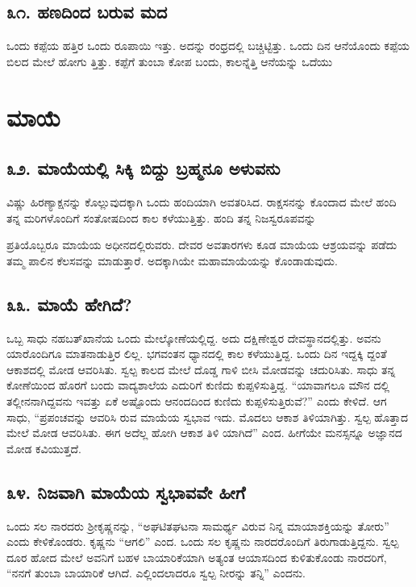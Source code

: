 \section{\num{೩೧. } ಹಣದಿಂದ ಬರುವ ಮದ}

ಒಂದು ಕಪ್ಪೆಯ ಹತ್ತಿರ ಒಂದು ರೂಪಾಯಿ ಇತ್ತು. ಅದನ್ನು ರಂಧ್ರದಲ್ಲಿ ಬಚ್ಚಿಟ್ಟಿತ್ತು. ಒಂದು ದಿನ ಆನೆಯೊಂದು ಕಪ್ಪೆಯ ಬಿಲದ ಮೇಲೆ ಹೋಗು ತ್ತಿತ್ತು. ಕಪ್ಪೆಗೆ ತುಂಬಾ ಕೋಪ ಬಂದು, ಕಾಲನ್ನೆತ್ತಿ ಆನೆಯನ್ನು ಒದೆಯು



\chapter{ಮಾಯೆ}

\section{\num{೩೨. } ಮಾಯೆಯಲ್ಲಿ ಸಿಕ್ಕಿ ಬಿದ್ದು ಬ್ರಹ್ಮನೂ ಅಳುವನು}

ವಿಷ್ಣು ಹಿರಣ್ಯಾಕ್ಷನನ್ನು ಕೊಲ್ಲುವುದಕ್ಕಾಗಿ ಒಂದು ಹಂದಿಯಾಗಿ ಅವತರಿಸಿದ. ರಾಕ್ಷಸನನ್ನು ಕೊಂದಾದ ಮೇಲೆ ಹಂದಿ ತನ್ನ ಮರಿಗಳೊಂದಿಗೆ ಸಂತೋಷದಿಂದ ಕಾಲ ಕಳೆಯುತ್ತಿತ್ತು. ಹಂದಿ ತನ್ನ ನಿಜಸ್ವರೂಪವನ್ನು

ಪ್ರತಿಯೊಬ್ಬರೂ ಮಾಯೆಯ ಅಧೀನದಲ್ಲಿರುವರು. ದೇವರ ಅವತಾರಗಳು ಕೂಡ ಮಾಯೆಯ ಆಶ್ರಯವನ್ನು ಪಡೆದು ತಮ್ಮ ಪಾಲಿನ ಕೆಲಸವನ್ನು ಮಾಡುತ್ತಾರೆ. ಅದಕ್ಕಾಗಿಯೇ ಮಹಾಮಾಯೆಯನ್ನು ಕೊಂಡಾಡುವುದು.


\section{\num{೩೩. } ಮಾಯೆ ಹೇಗಿದೆ?}

ಒಬ್ಬ ಸಾಧು ನಹಬತ್​ಖಾನೆಯ ಒಂದು ಮೇಲ್ಕೋಣೆಯಲ್ಲಿದ್ದ. ಅದು ದಕ್ಷಿಣೇಶ್ವರ ದೇವಸ್ಥಾನದಲ್ಲಿತ್ತು. ಅವನು ಯಾರೊಂದಿಗೂ ಮಾತನಾಡುತ್ತಿರ ಲಿಲ್ಲ. ಭಗವಂತನ ಧ್ಯಾನದಲ್ಲಿ ಕಾಲ ಕಳೆಯುತ್ತಿದ್ದ. ಒಂದು ದಿನ ಇದ್ದಕ್ಕಿ ದ್ದಂತೆ ಆಕಾಶದಲ್ಲಿ ಮೋಡ ಆವರಿಸಿತು. ಸ್ವಲ್ಪ ಕಾಲದ ಮೇಲೆ ದೊಡ್ಡ ಗಾಳಿ ಬೀಸಿ ಮೋಡವನ್ನು ಚದುರಿಸಿತು. ಸಾಧು ತನ್ನ ಕೋಣೆಯಿಂದ ಹೊರಗೆ ಬಂದು ವಾದ್ಯಶಾಲೆಯ ಎದುರಿಗೆ ಕುಣಿದು ಕುಪ್ಪಳಿಸುತ್ತಿದ್ದ. “ಯಾವಾಗಲೂ ಮೌನ ದಲ್ಲಿ ತಲ್ಲೀನನಾಗಿದ್ದವನು ಇವತ್ತು ಏಕೆ ಅಷ್ಟೊಂದು ಆನಂದದಿಂದ ಕುಣಿದು ಕುಪ್ಪಳಿಸುತ್ತಿರುವೆ?” ಎಂದು ಕೇಳಿದೆ. ಆಗ ಸಾಧು, “ಪ್ರಪಂಚವನ್ನು ಆವರಿಸಿ ರುವ ಮಾಯೆಯ ಸ್ವಭಾವ ಇದು. ಮೊದಲು ಆಕಾಶ ತಿಳಿಯಾಗಿತ್ತು. ಸ್ವಲ್ಪ ಹೊತ್ತಾದ ಮೇಲೆ ಮೋಡ ಆವರಿಸಿತು. ಈಗ ಅದೆಲ್ಲ ಹೋಗಿ ಆಕಾಶ ತಿಳಿ ಯಾಗಿದೆ” ಎಂದ. ಹೀಗೆಯೇ ಮನಸ್ಸನ್ನೂ ಅಜ್ಞಾನದ ಮೋಡ ಕವಿಯುತ್ತದೆ.


\section{\num{೩೪. } ನಿಜವಾಗಿ ಮಾಯೆಯ ಸ್ವಭಾವವೇ ಹೀಗೆ}

ಒಂದು ಸಲ ನಾರದರು ಶ್ರೀಕೃಷ್ಣನನ್ನು, “ಅಘಟಿತಘಟನಾ ಸಾಮರ್ಥ್ಯ ವಿರುವ ನಿನ್ನ ಮಾಯಾಶಕ್ತಿಯನ್ನು ತೋರು” ಎಂದು ಕೇಳಿಕೊಂಡರು. ಕೃಷ್ಣನು “ಆಗಲಿ” ಎಂದ. ಒಂದು ಸಲ ಕೃಷ್ಣನು ನಾರದರೊಂದಿಗೆ ತಿರುಗಾಡುತ್ತಿದ್ದನು. ಸ್ವಲ್ಪ ದೂರ ಹೋದ ಮೇಲೆ ಅವನಿಗೆ ಬಹಳ ಬಾಯಾರಿಕೆಯಾಗಿ ಅತ್ಯಂತ ಆಯಾಸದಿಂದ ಕುಳಿತುಕೊಂಡು ನಾರದರಿಗೆ, “ನನಗೆ ತುಂಬಾ ಬಾಯಾರಿಕೆ ಆಗಿದೆ. ಎಲ್ಲಿಂದಲಾದರೂ ಸ್ವಲ್ಪ ನೀರನ್ನು ತನ್ನಿ” ಎಂದನು.

